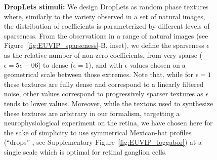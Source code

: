 \documentclass[a4paper, 10pt, twocolumns]{article}
\begin{document}
\begin{figure}[ht!]%
\caption{
{\bf DropLets stimuli:} We design DropLets as random phase textures where, similarly to the variety observed in a set of natural images, the distribution of coefficients is parameterized by different levels of sparseness. From the observations in a range of natural images (see Figure~\ref{fig:EUVIP_sparseness}-B, inset), we define the sparseness $\epsilon$ as the relative number of non-zero coefficients, from very sparse ($\epsilon=5e-06$) to dense ($\epsilon=1$), and with $\epsilon$ values chosen on a geometrical scale between those extremes. Note that, while for $\epsilon=1$ these textures are fully dense and correspond to a linearly filtered noise,  other values correspond to progressively sparser textures as $\epsilon$ tends to lower values. Moreover, while the textons used to synthesize these textures are arbitrary in our formalism, targetting a neurophysiological experiment on the retina, we have chosen here for the sake of simplicity to use symmetrical Mexican-hat profiles (``drops''\if{} , see Supplementary Figure~\ref{fig:EUVIP_loggabor}\fi) at a single scale which is optimal for retinal ganglion cells.
\label{fig:DropLets}}%
\end{figure}%
\end{document}
